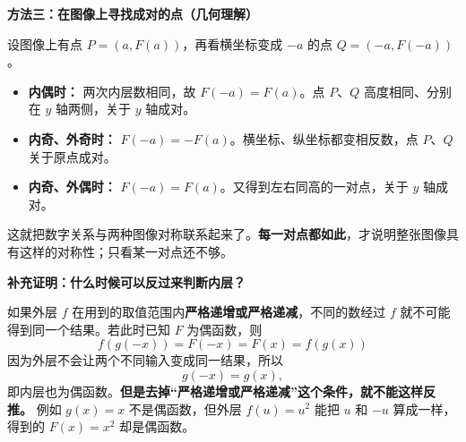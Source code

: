 \clearpage
\begin{proofbox}
\textbf{\textcolor{CProof}{方法三：在图像上寻找成对的点（几何理解）}}


设图像上有点 $P=(a,F(a))$，再看横坐标变成 $-a$ 的点 $Q=(-a,F(-a))$。
\begin{itemize}[leftmargin=*,itemsep=0.4em]
\item \textbf{内偶时：} 两次内层数相同，故 $F(-a)=F(a)$。点 $P$、$Q$ 高度相同、分别在 $y$ 轴两侧，关于 $y$ 轴成对。
\item \textbf{内奇、外奇时：} $F(-a)=-F(a)$。横坐标、纵坐标都变相反数，点 $P$、$Q$ 关于原点成对。
\item \textbf{内奇、外偶时：} $F(-a)=F(a)$。又得到左右同高的一对点，关于 $y$ 轴成对。
\end{itemize}
这就把数字关系与两种图像对称联系起来了。\textbf{每一对点都如此}，才说明整张图像具有这样的对称性；只看某一对点还不够。

\medskip
\end{proofbox}\clearpage\begin{proofbox}\textbf{\textcolor{CProof}{补充证明：什么时候可以反过来判断内层？}}


如果外层 $f$ 在用到的取值范围内\textbf{严格递增或严格递减}，不同的数经过 $f$ 就不可能得到同一个结果。若此时已知 $F$ 为偶函数，则
\[
f(g(-x))=F(-x)=F(x)=f(g(x))
\]
因为外层不会让两个不同输入变成同一结果，所以
\[
g(-x)=g(x),
\]
即内层也为偶函数。\textbf{但是去掉“严格递增或严格递减”这个条件，就不能这样反推。} 例如 $g(x)=x$ 不是偶函数，但外层 $f(u)=u^2$ 能把 $u$ 和 $-u$ 算成一样，得到的 $F(x)=x^2$ 却是偶函数。
\end{proofbox}
